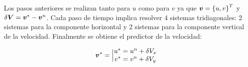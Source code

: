 Los pasos anteriores se realizan tanto para $u$ como para $v$ ya que $\boldsymbol{v}=\left\{ u,v \right\}^T$ y $\delta \boldsymbol{V} = \boldsymbol{v}^* - \boldsymbol{v}^n $. Cada paso de tiempo implica resolver 4 sistemas tridiagonales: 2 sistemas para la componente horizontal y 2 sistemas para la componente vertical de la velocidad. Finalmente se obtiene el predictor de la velocidad:

\begin{equation}
\boldsymbol{v}^* = \Big| \begin{matrix} u^* = u^n + \delta V_x \\ v^* = v^n + \delta V_y
\end{matrix}
\end{equation}
